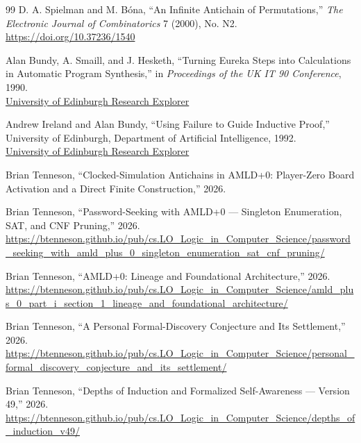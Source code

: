 \documentclass[11pt]{article}
\theoremstyle{definition}
\begin{document}
\clearpage
{}
{}
\begin{thebibliography}{99}
D. A. Spielman and M. B\'ona,
``An Infinite Antichain of Permutations,''
\emph{The Electronic Journal of Combinatorics} 7 (2000), No. N2.\\
\url{https://doi.org/10.37236/1540}


Alan Bundy, A. Smaill, and J. Hesketh,
``Turning Eureka Steps into Calculations in Automatic Program Synthesis,''
in \emph{Proceedings of the UK IT 90 Conference}, 1990.\\
\href{https://www.research.ed.ac.uk/en/publications/turning-eureka-steps-into-calculations-in-automatic-program-synth/}{University of Edinburgh Research Explorer}

Andrew Ireland and Alan Bundy,
``Using Failure to Guide Inductive Proof,''
University of Edinburgh, Department of Artificial Intelligence, 1992.\\
\href{https://www.research.ed.ac.uk/en/publications/using-failure-to-guide-inductive-proof/}{University of Edinburgh Research Explorer}

Brian Tenneson,
``Clocked-Simulation Antichains in AMLD+0: Player-Zero Board Activation and a Direct Finite Construction,'' 2026.

Brian Tenneson,
``Password-Seeking with AMLD+0 --- Singleton Enumeration, SAT, and CNF Pruning,'' 2026.\\
\url{https://btenneson.github.io/pub/cs.LO_Logic_in_Computer_Science/password_seeking_with_amld_plus_0_singleton_enumeration_sat_cnf_pruning/}

Brian Tenneson,
``AMLD+0: Lineage and Foundational Architecture,'' 2026.\\
\url{https://btenneson.github.io/pub/cs.LO_Logic_in_Computer_Science/amld_plus_0_part_i_section_1_lineage_and_foundational_architecture/}

Brian Tenneson,
``A Personal Formal-Discovery Conjecture and Its Settlement,'' 2026.\\
\url{https://btenneson.github.io/pub/cs.LO_Logic_in_Computer_Science/personal_formal_discovery_conjecture_and_its_settlement/}

Brian Tenneson,
``Depths of Induction and Formalized Self-Awareness --- Version 49,'' 2026.\\
\url{https://btenneson.github.io/pub/cs.LO_Logic_in_Computer_Science/depths_of_induction_v49/}


\end{thebibliography}
\end{document}
